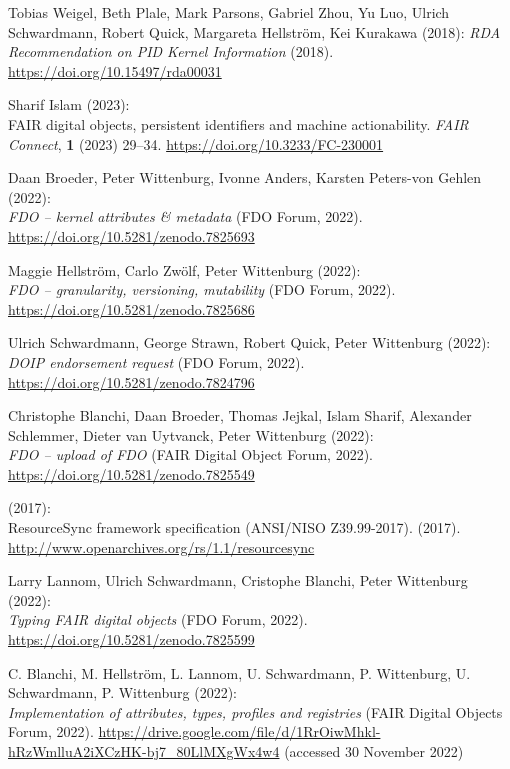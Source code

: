\begin{thebibliography}{9}
Tobias Weigel, Beth Plale, Mark Parsons, Gabriel Zhou, Yu Luo, Ulrich
Schwardmann, Robert Quick, Margareta Hellström, Kei Kurakawa (2018):
\emph{{RDA Recommendation} on {PID Kernel Information}} (2018).
\url{https://doi.org/10.15497/rda00031}

Sharif Islam (2023): \\
{FAIR} digital objects, persistent identifiers and
machine actionability. \emph{FAIR Connect}, \textbf{1} (2023) 29--34.
\url{https://doi.org/10.3233/FC-230001}

Daan Broeder, Peter Wittenburg, Ivonne Anders, Karsten Peters-von
Gehlen (2022): \\
\emph{{FDO} -- kernel attributes \& metadata} ({FDO
Forum}, 2022).
\url{https://doi.org/10.5281/zenodo.7825693}

Maggie Hellström, Carlo Zwölf, Peter Wittenburg (2022): \\
\emph{{FDO}
-- granularity, versioning, mutability} ({FDO Forum}, 2022).
\url{https://doi.org/10.5281/zenodo.7825686}

Ulrich Schwardmann, George Strawn, Robert Quick, Peter Wittenburg
(2022): \\
\emph{{DOIP} endorsement request} ({FDO Forum}, 2022).
\url{https://doi.org/10.5281/zenodo.7824796}

Christophe Blanchi, Daan Broeder, Thomas Jejkal, Islam Sharif, Alexander
Schlemmer, Dieter van Uytvanck, Peter Wittenburg (2022): \\
\emph{{FDO}
-- upload of {FDO}} ({FAIR Digital Object Forum}, 2022).
\url{https://doi.org/10.5281/zenodo.7825549}

(2017): \\
{ResourceSync} framework specification ({ANSI/NISO
Z39.99-2017}). (2017).
\url{http://www.openarchives.org/rs/1.1/resourcesync}

Larry Lannom, Ulrich Schwardmann, Cristophe Blanchi, Peter Wittenburg
(2022): \\
\emph{Typing {FAIR} digital objects} ({FDO Forum}, 2022).
\url{https://doi.org/10.5281/zenodo.7825599}

C. Blanchi, M. Hellström, L. Lannom, U. Schwardmann, P. Wittenburg, U.
Schwardmann, P. Wittenburg (2022): \\
\emph{Implementation of
attributes, types, profiles and registries} ({FAIR Digital Objects
Forum}, 2022).
\url{https://drive.google.com/file/d/1RrOiwMhkl-hRzWmlluA2iXCzHK-bj7_80LlMXgWx4w4}
(accessed 30 November 2022)


\end{thebibliography}
